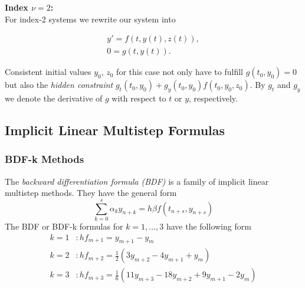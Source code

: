 	\begin{frame}
		\vfill
		\textbf{Index $\nu = 2$:}\\
		
		For index-2 systems we rewrite our system into
		
		\begin{align*}
			y' = f(t,y(t),z(t)), \\
			0 = g(t,y(t)).
		\end{align*}
		
		Consistent initial values $y_0$, $z_0$ for this case not only have to fulfill $g(t_0, y_0) = 0$ but also the \emph{hidden constraint} $g_t(t_0, y_0) + g_y(t_0, y_0)f(t_0, y_0, z_0)$. By $g_t$ and $g_y$ we denote the derivative of $g$ with respect to $t$ or $y$, respectively.
		\vfill
	\end{frame}
	
	\subsection*{Implicit Linear Multistep Formulas}
	
	\subsubsection{BDF-k Methods}
	
	\begin{frame}
		The \emph{backward differentiation formula (BDF)} is a family of implicit linear multistep methods. They have the general form
		\begin{equation}
			\sum_{k=0}^{s} \alpha_k y_{n+k} = h \beta f(t_{n+s}, y_{n+s})
		\end{equation}
		The BDF or BDF-k formulas for $k=1,...,3$ have the following form %
		\begin{align*}
			k = 1 &: h f_{m+1} = y_{m+1} - y_m \\
			k = 2 &: h f_{m+2} = \frac{1}{2} (3 y_{m+2} - 4 y_{m+1} + y_m) \\
			k = 3 &: h f_{m+3} = \frac{1}{6} (11 y_{m+3} - 18 y_{m+2} + 9 y_{m+1} - 2 y_m) %
		\end{align*}
	\end{frame}
	
